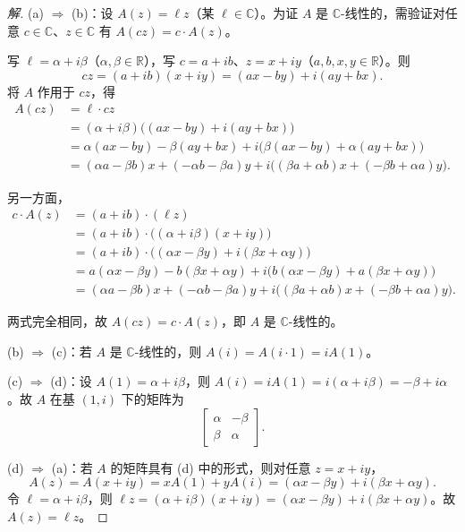 \documentclass[11pt,a4paper]{article}
\newcommand{\R}{\mathbb{R}}
\newcommand{\C}{\mathbb{C}}
\theoremstyle{definition}
\newenvironment{solution}{\begin{proof}[解]}{\end{proof}}
\begin{document}
\begin{solution}
(a) $\Rightarrow$ (b)：设 $A(z) = \ell z$（某 $\ell \in \C$）。为证 $A$ 是 $\C$-线性的，需验证对任意 $c \in \C$、$z \in \C$ 有 $A(cz) = c \cdot A(z)$。

写 $\ell = \alpha + i\beta$（$\alpha, \beta \in \R$），写 $c = a + ib$、$z = x + iy$（$a, b, x, y \in \R$）。则
\[
  cz = (a+ib)(x+iy) = (ax - by) + i(ay + bx).
\]
将 $A$ 作用于 $cz$，得
\[
  \begin{aligned}
    A(cz) &= \ell \cdot cz \\
    &= (\alpha + i\beta)\big((ax - by) + i(ay + bx)\big) \\
    &= \alpha(ax - by) - \beta(ay + bx)
    + i\big(\beta(ax - by) + \alpha(ay + bx)\big) \\
    &= (\alpha a - \beta b)x + (-\alpha b - \beta a)y
    + i\big((\beta a + \alpha b)x + (-\beta b + \alpha a)y\big).
  \end{aligned}
\]

另一方面，
\[
  \begin{aligned}
    c \cdot A(z) &= (a + ib) \cdot (\ell z) \\
    &= (a + ib) \cdot \big((\alpha + i\beta)(x + iy)\big) \\
    &= (a + ib) \cdot \big((\alpha x - \beta y) + i(\beta x + \alpha y)\big) \\
    &= a(\alpha x - \beta y) - b(\beta x + \alpha y)
    + i\big(b(\alpha x - \beta y) + a(\beta x + \alpha y)\big) \\
    &= (\alpha a - \beta b)x + (-\alpha b - \beta a)y
    + i\big((\beta a + \alpha b)x + (-\beta b + \alpha a)y\big).
  \end{aligned}
\]

两式完全相同，故 $A(cz) = c \cdot A(z)$，即 $A$ 是 $\C$-线性的。

(b) $\Rightarrow$ (c)：若 $A$ 是 $\C$-线性的，则 $A(i) = A(i \cdot 1) = i A(1)$。

(c) $\Rightarrow$ (d)：设 $A(1) = \alpha + i\beta$，则 $A(i) = iA(1) = i(\alpha + i\beta) = -\beta + i\alpha$。故 $A$ 在基 $(1, i)$ 下的矩阵为
\[
  \begin{bmatrix}
    \alpha & -\beta \\
    \beta & \alpha
  \end{bmatrix}.
\]

(d) $\Rightarrow$ (a)：若 $A$ 的矩阵具有 (d) 中的形式，则对任意 $z = x + iy$，
\[
  A(z) = A(x + iy) = xA(1) + yA(i) = (\alpha x - \beta y) + i(\beta x + \alpha y).
\]
令 $\ell = \alpha + i\beta$，则 $\ell z = (\alpha + i\beta)(x + iy) = (\alpha x - \beta y) + i(\beta x + \alpha y)$。故 $A(z) = \ell z$。
\end{solution}
\end{document}

